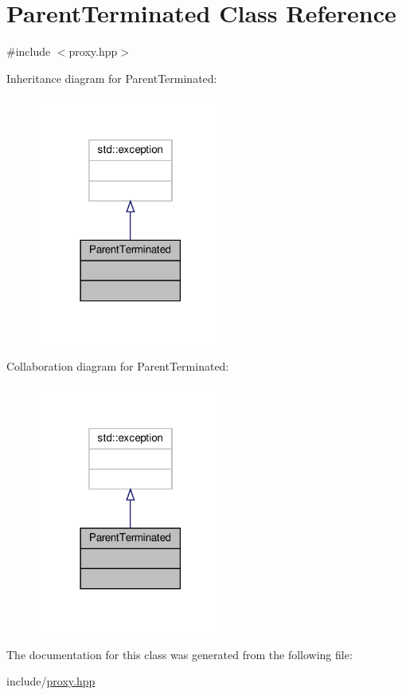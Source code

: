 \hypertarget{classParentTerminated}{}\section{Parent\+Terminated Class Reference}
\label{classParentTerminated}


{\ttfamily \#include $<$proxy.\+hpp$>$}



Inheritance diagram for Parent\+Terminated\+:
\nopagebreak
\begin{figure}[H]
\begin{center}
\leavevmode
\includegraphics[width=174pt]{classParentTerminated__inherit__graph}
\end{center}
\end{figure}


Collaboration diagram for Parent\+Terminated\+:
\nopagebreak
\begin{figure}[H]
\begin{center}
\leavevmode
\includegraphics[width=174pt]{classParentTerminated__coll__graph}
\end{center}
\end{figure}


The documentation for this class was generated from the following file\+:\begin{DoxyCompactItemize}
\item 
include/\hyperlink{proxy_8hpp}{proxy.\+hpp}\end{DoxyCompactItemize}
